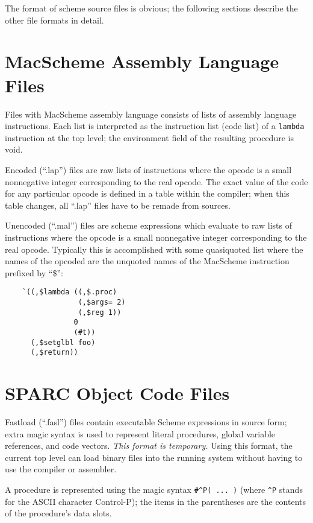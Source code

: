 The format of scheme source files is obvious; the following sections
describe the other file formats in detail.

\section{MacScheme Assembly Language Files}

Files with MacScheme assembly language consists of lists of assembly language
instructions. Each list is interpreted as the instruction list (code list)
of a {\tt lambda} instruction at the top level; the environment field of the
resulting procedure is void.

Encoded (``.lap'') files are raw lists of instructions where the opcode is a
small nonnegative integer corresponding to the real opcode. The exact value
of the code for any particular opcode is defined in a table within the
compiler; when this table changes, all ``.lap'' files have to be remade from
sources.

Unencoded (``.mal'') files are scheme expressions which evaluate to raw
lists of instructions where the opcode is a small nonnegative integer
corresponding to the real opcode. Typically this is accomplished with some
quasiquoted list where the names of the opcoded are the unquoted names of
the MacScheme instruction prefixed by ``\$'':

\begin{minipage}{\linewidth}
\begin{verbatim}
    `((,$lambda ((,$.proc)
                 (,$args= 2)
                 (,$reg 1))
                0
                (#t))
      (,$setglbl foo)
      (,$return))
\end{verbatim}
\end{minipage}

\section{SPARC Object Code Files}

Fastload (``.fasl'') files contain executable Scheme expressions in source
form; extra magic syntax is used to represent literal procedures, global
variable references, and code vectors. {\em This format is temporary.} Using
this format, the current top level can load binary files into the running
system without having to use the compiler or assembler.

A procedure is represented using the magic syntax \verb+#^P( ... )+ (where
\verb+^P+ stands for the ASCII character Control-P); the items in the
parentheses are the contents of the procedure's data slots.

